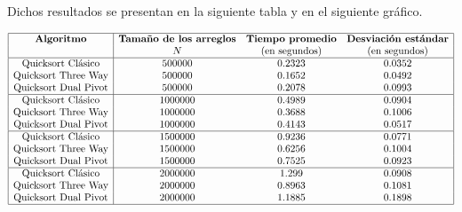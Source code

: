 \documentclass{article}
\begin{document}
	Dichos resultados se presentan en la siguiente tabla y en el siguiente gr\'afico. 

	$$\begin{array}{|c|ccc|}
		\hline
		\textbf{Algoritmo} & \textbf{Tamaño de los arreglos} &
		\textbf{Tiempo promedio} & \textbf{Desviación estándar}\\
		 & N & \text{(en segundos)} & \text{(en segundos)}\\
		\hline
		\text{Quicksort Cl\'asico} & 500000 & 0.2323 & 0.0352\\
		\text{Quicksort Three Way} & 500000 & 0.1652 & 0.0492\\
		\text{Quicksort Dual Pivot} & 500000 & 0.2078 & 0.0993\\
		\hline
		\text{Quicksort Cl\'asico} & 1000000 & 0.4989 & 0.0904\\
		\text{Quicksort Three Way} & 1000000 & 0.3688 & 0.1006\\
		\text{Quicksort Dual Pivot} & 1000000 & 0.4143 & 0.0517\\
		\hline
		\text{Quicksort Cl\'asico} & 1500000 & 0.9236 & 0.0771\\
		\text{Quicksort Three Way} & 1500000 & 0.6256 & 0.1004\\
		\text{Quicksort Dual Pivot} & 1500000 & 0.7525 & 0.0923\\
		\hline
		\text{Quicksort Cl\'asico} & 2000000 & 1.299 & 0.0908\\
		\text{Quicksort Three Way} & 2000000 & 0.8963 & 0.1081\\
		\text{Quicksort Dual Pivot} & 2000000 & 1.1885 & 0.1898\\
		\hline
	\end{array}$$\:
	
\end{document}
